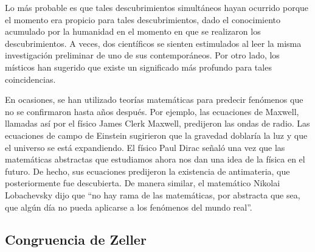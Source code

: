 \documentclass{article}
\begin{document}
Lo m\'as probable es que tales descubrimientos simult\'aneos hayan ocurrido
porque el momento era propicio para tales descubrimientos, dado el conocimiento
acumulado por la humanidad en el momento en que se realizaron los
descubrimientos. A veces, dos cient\'ificos se sienten estimulados al leer la
misma investigaci\'on preliminar de uno de sus contempor\'aneos. Por otro lado,
los m\'isticos han sugerido que existe un significado m\'as profundo para tales
coincidencias.

En ocasiones, se han utilizado teor\'ias matem\'aticas para predecir fen\'omenos
que no se confirmaron hasta a\~nos despu\'es. Por ejemplo, las ecuaciones de
Maxwell, llamadas as\'i por el f\'isico James Clerk Maxwell, predijeron las
ondas de radio. Las ecuaciones de campo de Einstein sugirieron que la gravedad
doblar\'ia la luz y que el universo se est\'a expandiendo. El f\'isico Paul
Dirac se\~nal\'o una vez que las matem\'aticas abstractas que estudiamos ahora
nos dan una idea de la f\'isica en el futuro. De hecho, sus ecuaciones
predijeron la existencia de antimateria, que posteriormente fue descubierta. De
manera similar, el matem\'atico Nikolai Lobachevsky dijo que “no hay rama de las
matem\'aticas, por abstracta que sea, que alg\'un d\'ia no pueda aplicarse a los
fen\'omenos del mundo real”.


\subsection{Congruencia de Zeller}

% 





\pagebreak
 

\end{document}
